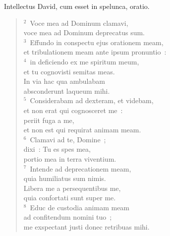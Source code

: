 \bchapter
\lettrine[lines=3,image=true,loversize=0.05,lraise=-0.03]{I}{}ntellectus David, cum esset in spelunca, oratio.
\begin{flushleft}\begin{verse}\vspace{6pt}${}^{2}$~Voce mea ad Dominum clamavi,\\ voce mea ad Dominum deprecatus sum.\\
${}^{3}$~Effundo in conspectu ejus orationem meam,\\ et tribulationem meam ante ipsum pronuntio~:\\
${}^{4}$~in deficiendo ex me spiritum meum,\\ et tu cognovisti semitas meas.\\ In via hac qua ambulabam\\ absconderunt laqueum mihi.\\
${}^{5}$~Considerabam ad dexteram, et videbam,\\ et non erat qui cognosceret me~:\\ periit fuga a me,\\ et non est qui requirat animam meam.\\
${}^{6}$~Clamavi ad te, Domine~;\\ dixi~: Tu es spes mea,\\ portio mea in terra viventium.\\
${}^{7}$~Intende ad deprecationem meam,\\ quia humiliatus sum nimis.\\ Libera me a persequentibus me,\\ quia confortati sunt super me.\\
${}^{8}$~Educ de custodia animam meam\\ ad confitendum nomini tuo~;\\ me exspectant justi donec retribuas mihi.\end{verse}\end{flushleft}



